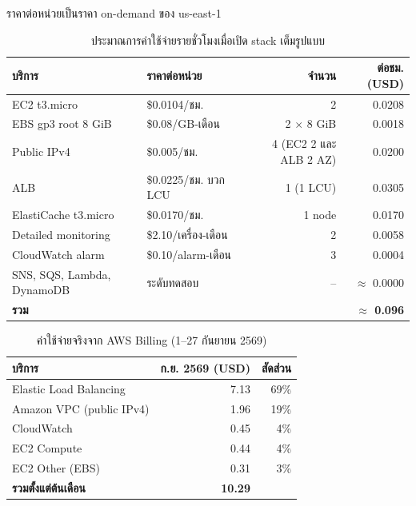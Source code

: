 ราคาต่อหน่วยเป็นราคา on-demand ของ us-east-1 

\begin{table}[H]
\centering
\caption{ประมาณการค่าใช้จ่ายรายชั่วโมงเมื่อเปิด stack เต็มรูปแบบ}
\label{tab:cost_hourly}
\begin{tabularx}{\textwidth}{lXrr}
\toprule
\textbf{บริการ} & \textbf{ราคาต่อหน่วย} & \textbf{จำนวน} & \textbf{ต่อชม. (USD)} \\
\midrule
EC2 t3.micro & \$0.0104/ชม. & 2 & 0.0208 \\
EBS gp3 root 8 GiB & \$0.08/GB-เดือน & 2 $\times$ 8 GiB & 0.0018 \\
Public IPv4 & \$0.005/ชม. & 4 (EC2 2 และ ALB 2 AZ) & 0.0200 \\
ALB & \$0.0225/ชม. บวก LCU & 1 (1 LCU) & 0.0305 \\
ElastiCache t3.micro & \$0.0170/ชม. & 1 node & 0.0170 \\
Detailed monitoring & \$2.10/เครื่อง-เดือน & 2 & 0.0058 \\
CloudWatch alarm & \$0.10/alarm-เดือน & 3 & 0.0004 \\
SNS, SQS, Lambda, DynamoDB & ระดับทดสอบ & -- & $\approx$ 0.0000 \\
\midrule
\textbf{รวม} & & & \textbf{$\approx$ 0.096} \\
\bottomrule
\end{tabularx}
\end{table}

\begin{table}[H]
\centering
\caption{ค่าใช้จ่ายจริงจาก AWS Billing (1--27 กันยายน 2569)}
\label{tab:billing}
\begin{tabularx}{\textwidth}{lrr}
\toprule
\textbf{บริการ} & \textbf{ก.ย. 2569 (USD)} & \textbf{สัดส่วน} \\
\midrule
Elastic Load Balancing & 7.13 & 69\% \\
Amazon VPC (public IPv4) & 1.96 & 19\% \\
CloudWatch & 0.45 & 4\% \\
EC2 Compute & 0.44 & 4\% \\
EC2 Other (EBS) & 0.31 & 3\% \\
\midrule
\textbf{รวมตั้งแต่ต้นเดือน} & \textbf{10.29} & \\
\bottomrule
\end{tabularx}
\end{table}

